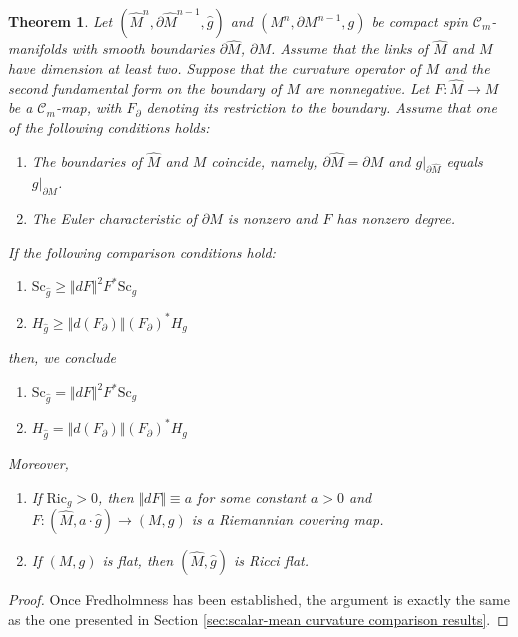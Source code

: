 \documentclass[12pt, reqno]{amsart}
\theoremstyle{plain} %
\newtheorem{theorem}{Theorem}[section]
\theoremstyle{definition}
\theoremstyle{remark}
\numberwithin{equation}{section}
\newcommand{\dom}[1]{\hat{#1}}
\newcommand{\onorm}[1]{\Vert #1 \Vert}
\newcommand{\bnd}[1]{\partial #1}
\newcommand{\cat}[1]{\mathcal{#1}}
\newcommand{\Sc}{\mathrm{Sc}}
\newcommand{\Ric}{\mathrm{Ric}}
\newcommand{\tdim}{n} %
\begin{document}
\begin{theorem}\label{thm:scalar-mean curvature comparison - manifolds with iacs}
    Let \((\dom{M}^{\tdim},\bnd{\dom{M}}^{\tdim-1},\dom{g})\) and \((M^{\tdim},\bnd{M}^{\tdim-1},g)\) be compact spin \(\cat{C}_m\)-manifolds with smooth boundaries \(\bnd{\dom{M}}\), \(\bnd{M}\).
    Assume that the links of \(\dom{M}\) and \(M\) have dimension at least two.
    Suppose that the curvature operator of \(M\) and the second fundamental form on the boundary of \(M\) are nonnegative.
    Let \(F \colon \dom{M} \to M\) be a \(\cat{C}_m\)-map, with \(F_\partial\) denoting its restriction to the boundary.
    Assume that one of the following conditions holds:
    \begin{enumerate}[label=\((\arabic*)\)]
        \item The boundaries of \(\dom{M}\) and \(M\) coincide, namely, \(\bnd{\dom{M}} = \bnd{M}\) and \(g|_{\bnd{\dom{M}}}\) equals \(g|_{\bnd{M}}\).
        \item The Euler characteristic of \(\bnd{M}\) is nonzero and \(F\) has nonzero degree.
    \end{enumerate}
    If the following comparison conditions hold:
    \begin{enumerate}[label=\textnormal{(\roman*)}]
        \item \(\Sc_{\dom{g}} \geq \onorm{dF}^2 F^*\Sc_g\)
        \item \(H_{\dom{g}} \geq \onorm{d(F_\partial)} (F_\partial)^*H_g\)
    \end{enumerate}
    then, we conclude
    \begin{enumerate}[label=\textup{(\Roman*)}]
        \item \(\Sc_{\dom{g}} = \onorm{dF}^2 F^* \Sc_g\)
        \item \(H_{\dom{g}} = \onorm{d(F_\partial)} (F_\partial)^*H_g\)
    \end{enumerate}
    Moreover,
    \begin{enumerate}[label=\((\mathrm{\Roman*}^\prime)\)]
        \item If \(\Ric_g > 0\), then \(\onorm{dF} \equiv a\) for some constant \(a > 0\) and \(F \colon (\dom{M}, a \cdot \dom{g}) \to (M,g)\) is a Riemannian covering map.
        \item If \((M, g)\) is flat, then \((\dom{M}, \dom{g})\) is Ricci flat.
    \end{enumerate}
\end{theorem}
\begin{proof}
    Once Fredholmness has been established, the argument is exactly the same as the one presented in Section \ref{sec:scalar-mean curvature comparison results}.
\end{proof}
\end{document}

